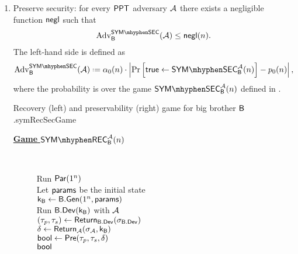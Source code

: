 \begin{defn}
\begin{enumerate}[1.]
\begin{boxfigTwo}{Distinguish game for weak/strong symmetric subversion.}{symdetectgame}
\begin{minipage}{0.45\textwidth}
\begin{description}
		If $b=0$: $\{$ Run $\dev$ with $\eve$ \\
	    $(\ptrans,\strans)\leftarrow\return_{\dev}(\st_{\dev}) \}$ \\
		If $b=1$:$\{$ Run $\bbdev(\bbk)$ with $\eve$ \\
		$(\ptrans,\strans)\leftarrow\return_{\bbdev}(\st_{\bbdev}) \}$ \\
		\Ret $(\ptrans,\strans)$
		\smallskip
  	\end{description}
\end{minipage}
     \\ \hline 
	 $\eve$ is allowed to make $t$ queries to the oracle $\oracle$. &  $\user$ is allowed to make $t$ queries to the oracle $\oracle$ \\
	  Device and $\eve$ start with initial state $\params$ for each query. & Device and $\user$ start with initial state $\params$ for each query.
	 \\
\end{boxfigTwo}
		\item Preserve security: for every $\mathsf{PPT}$ adversary $\mathcal{A}$ there exists a negligible function $\operatorname{\mathsf{negl}}$ such that
		\begin{align*}
			\adv_{\bb}^{\symsecgame}(\adve) \leq \negl(n).
		\end{align*}   
		The left-hand side is defined as
		\begin{align*}
			\adv_{\bb}^{\symsecgame}(\adve) \defeq \secf(n)\cdot\left\vert \prob{\true\leftarrow\symsecgame_{\bb}^{\adve}(n)} - \basep(n)\right\vert,
		\end{align*}
		where the probability is over the game $\symsecgame_{\bb}^{\adve}(n)$ defined in .
		\begin{boxfigTwo}{Recovery (left) and preservability (right) game for big brother $\mathsf{B}$.}{symRecSecGame}
\begin{minipage}{0.45\textwidth}
    \smallskip
	\begin{description}
	\item[\underline{\textbf{Game} $\symrecgame_{\bb}^{\adve}(n)$}] ~
 	
 		Run $\operatorname{\mathsf{Par}}(1^n)$ \\
 		Let $\params$ be the initial state \\
 		$\mathsf{k}_{\mathsf{B}}\leftarrow \mathsf{B}.\mathsf{Gen}(1^n,\mathsf{params})$ \\
 		Run $\bbdev(\bbk)$ with $\mathcal{A}$ \\
 		$(\tau_p,\tau_s)\leftarrow \operatorname{\mathsf{Return}}_{\mathsf{B}.\mathsf{Dev}}(\sigma_{\mathsf{B}.\mathsf{Dev}})$ \\	
 		$\delta\leftarrow \operatorname{\mathsf{Return}}_{\mathcal{A}}(\sigma_{\mathcal{A}},\mathsf{k}_{\mathsf{B}})$ \\
 		$\mathsf{bool} \leftarrow \operatorname{\mathsf{Pre}}(\tau_p,\tau_s,\delta)$ \\
		\Ret $\mathsf{bool}$
		\smallskip
  	\end{description}
  	

\end{minipage}
\end{boxfigTwo}
\end{enumerate}
\end{defn}
